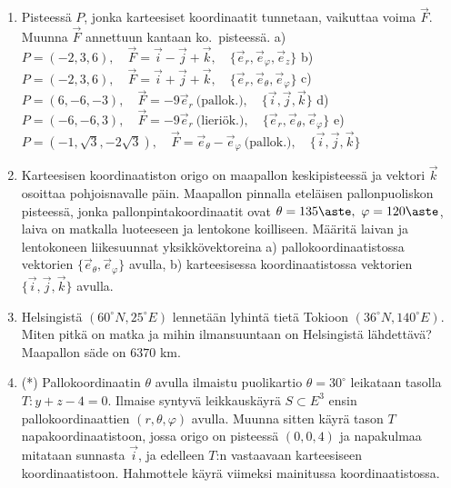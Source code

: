 \begin{enumerate}
\item
Pisteessä $P$, jonka karteesiset koordinaatit tunnetaan, vaikuttaa voima $\vec F$.
Muunna $\vec F$ annettuun kantaan ko.\ pisteessä. \vspace{1mm}\newline
a)\, $P=(-2,3,6), \quad \vec F=\vec i-\vec j+\vec k, \quad 
                        \{\vec e_r,\vec e_\varphi,\vec e_z\}$ \newline
b)\, $P=(-2,3,6), \quad \vec F=\vec i+\vec j+\vec k, \quad 
                        \{\vec e_r,\vec e_\theta,\vec e_\varphi\}$ \newline
c)\, $P=(6,-6,-3), \quad \vec F=-9\vec e_r\ \text{(pallok.)}, \quad 
                        \{\vec i,\vec j,\vec k\}$ \newline
d)\, $P=(-6,-6,3), \quad \vec F=-9\vec e_r\ \text{(lieriök.)}, \quad 
                        \{\vec e_r,\vec e_\theta,\vec e_\varphi\}$ \newline
e)\, $P=(-1,\sqrt{3},-2\sqrt{3}), \quad \vec F=\vec e_\theta-\vec e_\varphi\
                         \text{(pallok.)}, \quad \{\vec i,\vec j,\vec k\}$

\item
Karteesisen koordinaatiston origo on maapallon keskipisteessä ja vektori $\vec k$ osoittaa
pohjoisnavalle päin. Maapallon pinnalla eteläisen pallonpuoliskon pisteessä, jonka
pallonpintakoordinaatit ovat $\theta=135\aste,\ \varphi=120\aste$, laiva on matkalla
luoteeseen ja lentokone koilliseen. Määritä laivan ja lentokoneen liikesuunnat
yksikkövektoreina a) pallokoordinaatistossa vektorien $\{\vec e_\theta,\vec e_\varphi\}$ 
avulla, b) karteesisessa koordinaatistossa vektorien $\{\vec i,\vec j,\vec k\}$ avulla.

\item
Helsingistä $(60^{\circ}N,25^{\circ}E)$ lennetään lyhintä tietä Tokioon 
 $(36^{\circ}N,140^{\circ}E)$. Miten pitkä on matka ja mihin 
ilmansuuntaan on Helsingistä lähdettävä? Maapallon säde on $6370$ km.

\item (*)
Pallokoordinaatin $\theta $ avulla ilmaistu puolikartio $\theta =30^{\circ} $
leikataan tasolla $T: y+z-4=0$. Ilmaise syntyvä leikkauskäyrä  $S\subset E^3$ ensin 
pallokoordinaattien $(r,\theta ,\varphi)$ avulla. Muunna sitten käyrä tason $T$ 
napakoordinaatistoon, jossa origo on pisteessä $(0,0,4)$ ja napakulmaa mitataan sunnasta
$\vec i$, ja edelleen $T$:n vastaavaan karteesiseen koordinaatistoon. Hahmottele käyrä 
viimeksi mainitussa koordinaatistossa.

\end{enumerate}
